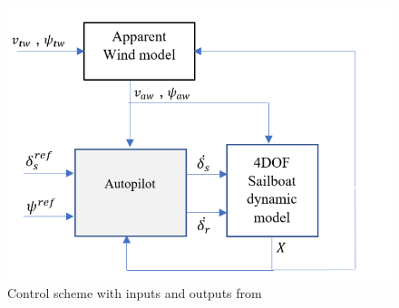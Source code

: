 \documentclass[conference]{IEEEtran}
\begin{document}
\begin{figure}
    \centering
    \includegraphics{documents/figures/control_scheme.PNG}
    \caption{Control scheme with inputs and outputs from \cite{HelmiAbrougui2019}}
    \label{fig:control_scheme.png}
\end{figure}




\end{document}
